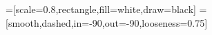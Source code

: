 \newcommand{\sidenote}[1]{\begin{itemize} \item #1 \end{itemize}}
\newcommand{\hlmath}[1]{\textrm{\color{blue}\ensuremath{#1}}}

\newcommand{\obj}[1]{%
    {%
    \begin{minipage}{6cm}
      #1
    \end{minipage}
    }
}
\newcommand{\objw}[2]{%
    {%
    \begin{minipage}{#1}
      #2
    \end{minipage}
    }
}
=[scale=0.8,rectangle,fill=white,draw=black]
=[smooth,dashed,in=-90,out=-90,looseness=0.75]

\makeatletter
\newcommand*{\centerfloat}{%
  \parindent \z@
  \leftskip \z@ \@plus 1fil \@minus \textwidth
  \rightskip\leftskip
  \parfillskip \z@skip}
\makeatother
